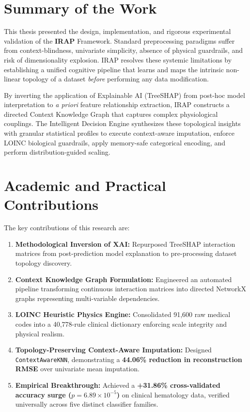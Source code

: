\documentclass[MTech]{ugthesis}
\begin{document}
\section{Summary of the Work}
This thesis presented the design, implementation, and rigorous experimental validation of the \textbf{\ac{IRAP}} Framework. Standard preprocessing paradigms suffer from context-blindness, univariate simplicity, absence of physical guardrails, and risk of dimensionality explosion. \ac{IRAP} resolves these systemic limitations by establishing a unified cognitive pipeline that learns and maps the intrinsic non-linear topology of a dataset \textit{before} performing any data modification.

By inverting the application of Explainable AI (Tree\ac{SHAP}) from post-hoc model interpretation to \textit{a priori} feature relationship extraction, \ac{IRAP} constructs a directed Context Knowledge Graph that captures complex physiological couplings. The Intelligent Decision Engine synthesizes these topological insights with granular statistical profiles to execute context-aware imputation, enforce LOINC biological guardrails, apply memory-safe categorical encoding, and perform distribution-guided scaling.

\section{Academic and Practical Contributions}
The key contributions of this research are:
\begin{enumerate}
    \item \textbf{Methodological Inversion of XAI:} Repurposed Tree\ac{SHAP} interaction matrices from post-prediction model explanation to pre-processing dataset topology discovery.
    \item \textbf{Context Knowledge Graph Formulation:} Engineered an automated pipeline transforming continuous interaction matrices into directed NetworkX graphs representing multi-variable dependencies.
    \item \textbf{LOINC Heuristic Physics Engine:} Consolidated 91,600 raw medical codes into a 40,778-rule clinical dictionary enforcing scale integrity and physical realism.
    \item \textbf{Topology-Preserving Context-Aware Imputation:} Designed \texttt{ContextAwareKNN}, demonstrating a \textbf{44.06\% reduction in reconstruction RMSE} over univariate mean imputation.
    \item \textbf{Empirical Breakthrough:} Achieved a \textbf{+31.86\% cross-validated accuracy surge ($p = 6.89 \times 10^{-5}$)} on clinical hematology data, verified universally across five distinct classifier families.
\end{enumerate}
\end{document}
